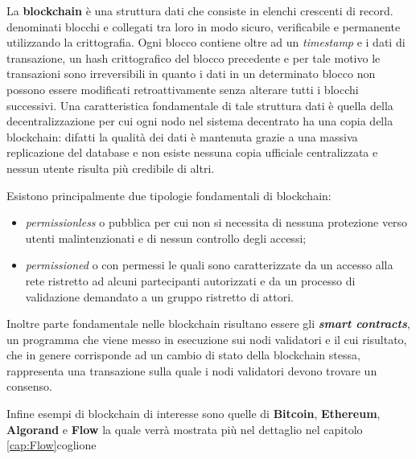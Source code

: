 La \textbf{blockchain} è una struttura dati che consiste in elenchi crescenti di record. denominati blocchi e collegati tra loro in modo sicuro, verificabile e permanente utilizzando la crittografia. Ogni blocco contiene oltre ad un \textit{timestamp} e i dati di transazione, un hash crittografico del blocco precedente e per tale motivo le transazioni sono irreversibili in quanto i dati in un determinato blocco non possono essere modificati retroattivamente senza alterare tutti i blocchi successivi. 
Una caratteristica fondamentale di tale struttura dati è quella della decentralizzazione per cui ogni nodo nel sistema decentrato ha una copia della blockchain: difatti la qualità dei dati è mantenuta grazie a una massiva replicazione del database e non esiste nessuna copia ufficiale centralizzata e nessun utente risulta più credibile di altri.

Esistono principalmente due tipologie fondamentali di blockchain:
\begin{itemize}
    \item \textit{permissionless} o pubblica per cui non si necessita di nessuna protezione verso utenti malintenzionati e di nessun controllo degli accessi;
    \item \textit{permissioned} o con permessi le quali sono caratterizzate da un accesso alla rete ristretto ad alcuni partecipanti autorizzati e da un processo di validazione demandato a un gruppo ristretto di attori.
\end{itemize}

Inoltre parte fondamentale nelle blockchain risultano essere gli \textit{\textbf{smart contracts}}, un programma che viene messo in esecuzione sui nodi validatori e il cui risultato, che in genere corrisponde ad un cambio di stato della blockchain stessa, rappresenta una transazione sulla quale i nodi validatori devono trovare un consenso.

Infine esempi di blockchain di interesse sono quelle di \textbf{Bitcoin}, \textbf{Ethereum}, \textbf{Algorand} e \textbf{Flow} la quale verrà mostrata più nel dettaglio nel capitolo \ref{cap:Flow}coglione